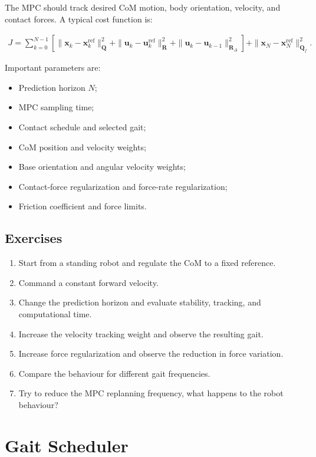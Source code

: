 \documentclass[11pt,a4paper]{article}
\begin{document}
The MPC should track desired CoM motion, body orientation, velocity, and contact forces. A typical cost function is:

\begin{align*}
	J =
	\sum_{k=0}^{N-1}
	\left[
	\|\bm{x}_k-\bm{x}^{\mathrm{ref}}_k\|_{\bm{Q}}^2
	+
	\|\bm{u}_k-\bm{u}^{\mathrm{ref}}_k\|_{\bm{R}}^2
	+
	\|\bm{u}_k-\bm{u}_{k-1}\|_{\bm{R}_{\Delta}}^2
	\right]
	+
	\|\bm{x}_{N}-\bm{x}^{\mathrm{ref}}_{N}\|_{\bm{Q}_f}^2.
\end{align*}

Important parameters are:

\begin{itemize}
	\item Prediction horizon \(N\);
	\item MPC sampling time;
	\item Contact schedule and selected gait;
	\item CoM position and velocity weights;
	\item Base orientation and angular velocity weights;
	\item Contact-force regularization and force-rate regularization;
	\item Friction coefficient and force limits.
\end{itemize}

\subsection*{Exercises}

\begin{enumerate}[label=\arabic*.]
	\item Start from a standing robot and regulate the CoM to a fixed reference.
	\item Command a constant forward velocity.
	\item Change the prediction horizon and evaluate stability, tracking, and computational time.
	\item Increase the velocity tracking weight and observe the resulting gait.
	\item Increase force regularization and observe the reduction in force variation.
	\item Compare the behaviour for different gait frequencies.
	\item Try  to reduce the MPC replanning frequency, what happens to the robot behaviour?
\end{enumerate}

\section{Gait Scheduler}
\end{document}
